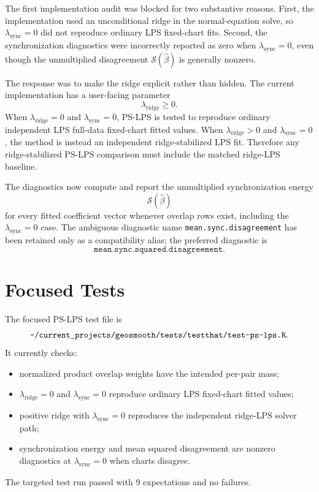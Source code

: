 \documentclass[11pt]{article}
\begin{document}
The first implementation audit was blocked for two substantive reasons.  First,
the implementation used an unconditional ridge in the normal-equation solve, so
\(\lambda_{\mathrm{sync}}=0\) did not reproduce ordinary LPS fixed-chart fits.
Second, the synchronization diagnostics were incorrectly reported as zero when
\(\lambda_{\mathrm{sync}}=0\), even though the unmultiplied disagreement
\(\mathcal S(\widehat\beta)\) is generally nonzero.

The response was to make the ridge explicit rather than hidden.  The current
implementation has a user-facing parameter
\[
  \lambda_{\mathrm{ridge}}\ge 0.
\]
When \(\lambda_{\mathrm{ridge}}=0\) and
\(\lambda_{\mathrm{sync}}=0\), PS-LPS is tested to reproduce ordinary
independent LPS full-data fixed-chart fitted values.  When
\(\lambda_{\mathrm{ridge}}>0\) and \(\lambda_{\mathrm{sync}}=0\), the method is
instead an independent ridge-stabilized LPS fit.  Therefore any
ridge-stabilized PS-LPS comparison must include the matched ridge-LPS baseline.

The diagnostics now compute and report the unmultiplied synchronization energy
\[
  \mathcal S(\widehat\beta)
\]
for every fitted coefficient vector whenever overlap rows exist, including the
\(\lambda_{\mathrm{sync}}=0\) case.  The ambiguous diagnostic name
\texttt{mean.sync.disagreement} has been retained only as a compatibility alias;
the preferred diagnostic is
\[
  \texttt{mean.sync.squared.disagreement}.
\]

\section{Focused Tests}

The focused PS-LPS test file is
\[
  \texttt{\string~/current\_projects/geosmooth/tests/testthat/test-ps-lps.R}.
\]
It currently checks:
\begin{itemize}[leftmargin=*]
  \item normalized product overlap weights have the intended per-pair mass;
  \item \(\lambda_{\mathrm{ridge}}=0\) and
    \(\lambda_{\mathrm{sync}}=0\) reproduce ordinary LPS fixed-chart fitted
    values;
  \item positive ridge with \(\lambda_{\mathrm{sync}}=0\) reproduces the
    independent ridge-LPS solver path;
  \item synchronization energy and mean squared disagreement are nonzero
    diagnostics at \(\lambda_{\mathrm{sync}}=0\) when charts disagree.
\end{itemize}
The targeted test run passed with 9 expectations and no failures.
\end{document}

